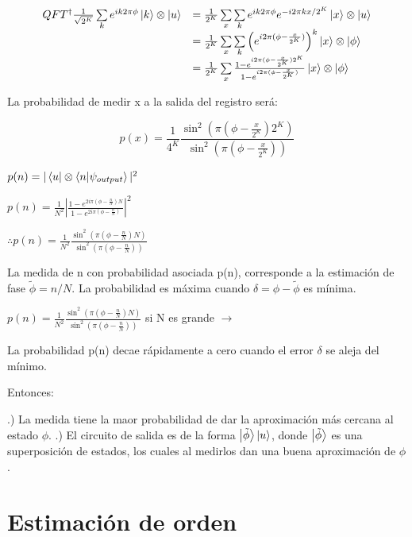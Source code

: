 \begin{equation}
\begin{array}{r l}
    QFT^\dagger \frac{1}{\sqrt{2^K}} \sum\limits_k e^{i k 2\pi \phi} \ket{k} \otimes \ket{u} &= \frac{1}{2^K} \sum\limits_x \sum\limits_k e^{i k 2\pi \phi} e^{-i 2\pi k x / 2^K} \ket{x} \otimes \ket{u} \\
    &= \frac{1}{2^K} \sum\limits_x\sum\limits_k \left(e^{i 2\pi (\phi - \frac{x}{2^K})}\right)^k \ket{x} \otimes \ket{\phi} \\
    &= \frac{1}{2^K} \sum\limits_x \frac{1 - e^{i 2\pi (\phi - \frac{x}{2^K}) 2^K}}{1 - e^{i 2\pi (\phi - \frac{x}{2^K})}} \ket{x} \otimes \ket{\phi} \\
\end{array}
\end{equation}

La probabilidad de medir x a la salida del registro será:

\begin{equation}
    p(x) = \frac{1}{4^{K}} \frac{\sin^2(\pi (\phi - \frac{x}{2^K}) 2^K)}{\sin^2(\pi (\phi - \frac{x}{2^K}))}
\end{equation}

$p(n) = |\bra{u} \otimes \bra{n} \ket{\psi_{output}}|^2$

$p(n) = \frac{1}{N^2} |\frac{1 - e^{2 i \pi (\phi - \frac{n}{N})N}}{1 - e^{2 i \pi (\phi - \frac{n}{N})}}|^2$

$\therefore p(n) = \frac{1}{N^2} \frac{\sin^2(\pi (\phi - \frac{n}{N}) N)}{\sin^2(\pi (\phi - \frac{n}{N}))}$

La medida de n con probabilidad asociada p(n), corresponde a la estimación de fase $\tilde{\phi} = n/N$. La probabilidad es máxima cuando $\delta = \phi - \tilde{\phi}$ es mínima.

$p(n) = \frac{1}{N^2} \frac{\sin^2(\pi (\phi - \frac{n}{N}) N)}{\sin^2(\pi (\phi - \frac{n}{N}))}$ si N es grande $\rightarrow$ %

La probabilidad p(n) decae rápidamente a cero cuando el error $\delta$ se aleja del mínimo.

Entonces:

.) La medida tiene la maor probabilidad de dar la aproximación más cercana al estado $\phi$.
.) El circuito de salida es de la forma $\ket{\tilde{\phi}} \ket{u}$, donde $\ket{\tilde{\phi}}$ es una superposición de estados, los cuales al medirlos dan una buena aproximación de $\phi$.

\section{Estimación de orden}

